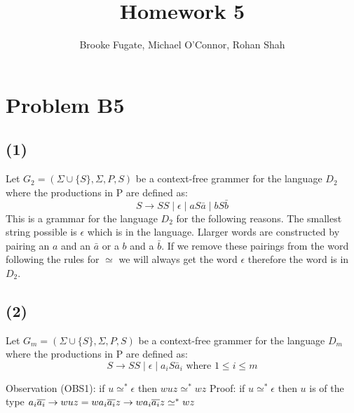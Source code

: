 \documentclass[12pt]{article}
\begin{document}
\pagestyle{plain}
\titleformat{\subsection}[runin]
  {\normalfont\large\bfseries}{\thesubsection}{1em}{}

\title{Homework 5}
\author{Brooke Fugate, Michael O'Connor, Rohan Shah}
\date{}

\maketitle

\section*{Problem B5}
\subsection*{(1)} Let $G_2 = (\Sigma\cup \{S\},\Sigma,P,S)$ be a context-free
grammer for the language $D_2$ where the productions in P are defined as:
$$ S \rightarrow SS \mid \epsilon \mid aS\bar a \mid bS\bar b$$
This is a grammar for the language $D_2$ for the following reasons.
The smallest string possible is $\epsilon$ which is in the language.
Llarger words are constructed by pairing an $a$ and an $\bar a$ or a $b$ and a
$ \bar b$. If we remove these pairings from the word following the rules for
$\simeq$ we will always get the word $\epsilon$ therefore the word is in $D_2$.

\subsection*{(2)} Let $G_m = (\Sigma\cup \{S\},\Sigma,P,S)$ be a context-free
grammer for the language $D_m$ where the productions in P are defined as:
$$S \rightarrow SS\mid \epsilon \mid a_iS\bar a_i \text{ where } 1\le i\le m$$


Observation (OBS1): if $u \simeq^* \epsilon$ then $wuz \simeq^* wz$\newline
Proof: if $u \simeq^* \epsilon$ then $u$ is of the type $a_i\overline{a_i} \rightarrow wuz = wa_i\overline{a_i}z \rightarrow wa_i\overline{a_i}z \simeq^* wz$\newline
\end{document}

